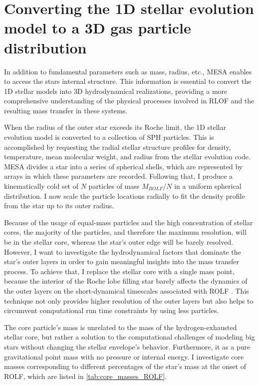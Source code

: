 \section{Converting the 1D stellar evolution model to a 3D gas particle distribution}

In addition to fundamental parameters such as mass, radius, etc., MESA enables to access the stars internal structure. This information is essential to convert the 1D stellar models into 3D hydrodynamical realizations, providing a more comprehensive understanding of the physical processes involved in RLOF and the resulting mass transfer in these systems.

When the radius of the outer star exceeds its Roche limit, the 1D stellar evolution model is converted to a collection of SPH particles. This is accomplished by requesting the radial stellar structure profiles for density, temperature, mean molecular weight, and radius from the stellar evolution code. MESA divides a star into a series of spherical shells, which are represented by arrays in which these parameters are recorded. Following that, I produce a kinematically cold set of $N$ particles of mass $M_{ROLF}/N$ in a uniform spherical distribution. I now scale the particle locations radially to fit the density profile from the star up to its outer radius.

Because of the usage of equal-mass particles and the high concentration of stellar cores, the majority of the particles, and therefore the maximum resolution, will be in the stellar core, whereas the star's outer edge will be barely resolved. However, I want to investigate the hydrodynamical factors that dominate the star's outer layers in order to gain meaningful insights into the mass transfer process. To achieve that, I replace the stellar core with a single mass point, because the interior of the Roche lobe filling star barely affects the dynamics of the outer layers on the short-dynamical timescales associated with ROLF \citep{deupree2005structure}.  This technique not only provides higher resolution of the outer layers but also helps to circumvent computational run time constraints by using less particles.

The core particle's mass is unrelated to the mass of the hydrogen-exhausted stellar core, but rather a solution to the computational challenges of modeling big stars without changing the stellar envelope's behavior. Furthermore, it as a pure gravitational point mass with no pressure or internal energy. I investigate core masses corresponding to different percentages of the star's mass at the onset of ROLF, which are listed in \cref{tab:core_masses_ROLF}. 

